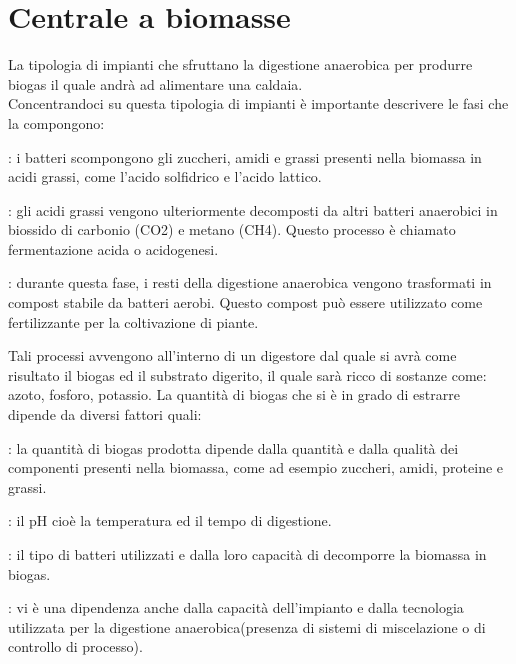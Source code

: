 \section{Centrale a biomasse}
La tipologia di impianti che sfruttano la digestione anaerobica per produrre biogas il quale andrà ad alimentare una caldaia.\\
Concentrandoci su questa tipologia di impianti è importante descrivere le fasi che la compongono:\\
\begin{description}[labelindent=5mm]
    \item[$\bullet$ Produzione di acidi grassi]: i batteri scompongono gli zuccheri, amidi e grassi presenti nella biomassa in acidi grassi, come l'acido solfidrico e l'acido lattico.
    \item[$\bullet$ Fermentazione]: gli acidi grassi vengono ulteriormente decomposti da altri batteri anaerobici in biossido di carbonio (CO2) e metano (CH4). Questo processo è chiamato fermentazione acida o acidogenesi.
    \item[$\bullet$ Maturazione]: durante questa fase, i resti della digestione anaerobica vengono trasformati in compost stabile da batteri aerobi. Questo compost può essere utilizzato come fertilizzante per la coltivazione di piante.
\end{description}
Tali processi avvengono all'interno di un digestore dal quale si avrà come risultato il biogas ed il substrato digerito, il quale sarà ricco di sostanze come: azoto, fosforo, potassio.
La quantità di biogas che si è in grado di estrarre dipende da diversi fattori quali:
\begin{description}[labelindent=5mm]
    \item[$\bullet$ Composizione chimica della biomassa]: la quantità di biogas prodotta dipende dalla quantità e dalla qualità dei componenti presenti nella biomassa, come ad esempio zuccheri, amidi, proteine e grassi.
    \item[$\bullet$ Condizioni ambientali]: il pH cioè la temperatura ed il tempo di digestione.
    \item[$\bullet$ Tipo di batteri]: il tipo di batteri utilizzati e dalla loro capacità di decomporre la biomassa in biogas.
    \item[$\bullet$ Dimensione e tecnologia dell'impianto]: vi è una dipendenza anche dalla capacità dell'impianto e dalla tecnologia utilizzata per la digestione anaerobica(presenza di sistemi di miscelazione o di controllo di processo).
\end{description}

